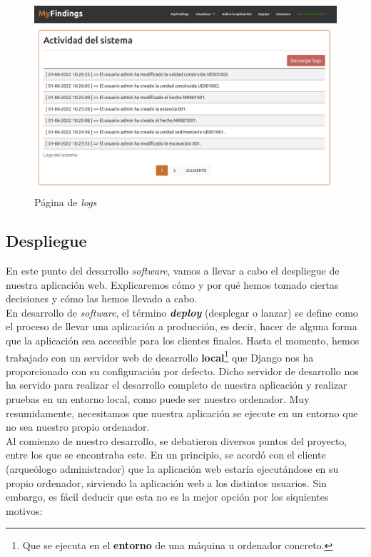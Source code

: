\begin{enumerate}
            \begin{figure}[H]
                \centering
                \includegraphics[scale=0.20]{imagenes/logs.png}
                \caption{Página de \textit{logs}}
                \label{fig:log-template}
            \end{figure}

    \end{enumerate}

\subsection{Despliegue}
En este punto del desarrollo \textit{software}, vamos a llevar a cabo el despliegue de
nuestra aplicación web. Explicaremos cómo y por qué hemos tomado ciertas decisiones
y cómo las hemos llevado a cabo. \\

En desarrollo de \textit{software}, el término \textbf{\textit{deploy}} (desplegar o lanzar)
\cite{deploy} se define como el proceso de llevar una aplicación a producción, es decir,
hacer de alguna forma que la aplicación sea accesible para los clientes finales. Hasta el
momento, hemos trabajado con un servidor web de desarrollo \textbf{local}\footnote{Que se
ejecuta en el \textbf{entorno} de una máquina u ordenador concreto.} que Django nos ha
proporcionado con su configuración por defecto. Dicho servidor de desarrollo nos ha servido
para realizar el desarrollo completo de nuestra aplicación y realizar pruebas en un entorno
local, como puede ser nuestro ordenador. Muy resumidamente, necesitamos que nuestra
aplicación se ejecute en un entorno que no sea nuestro propio ordenador. \\

Al comienzo de nuestro desarrollo, se debatieron diversos puntos del proyecto, entre los
que se encontraba este. En un principio, se acordó con el cliente (arqueólogo administrador)
que la aplicación web estaría ejecutándose en su propio ordenador, sirviendo la aplicación
web a los distintos usuarios. Sin embargo, es fácil deducir que esta no es la mejor opción por
los siquientes motivos:

